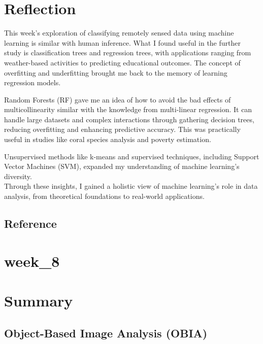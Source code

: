 \documentclass[
  letterpaper,
  DIV=11,
  numbers=noendperiod]{scrreprt}
\begin{document}

\chapter{Reflection}\label{reflection-3}

This week's exploration of classifying remotely sensed data using
machine learning is similar with human inference. What I found useful in
the further study is classification trees and regression trees, with
applications ranging from weather-based activities to predicting
educational outcomes. The concept of overfitting and underfitting
brought me back to the memory of learning regression models.

Random Forests (RF) gave me an idea of how to avoid the bad effects of
multicollinearity similar with the knowledge from multi-linear
regression. It can handle large datasets and complex interactions
through gathering decision trees, reducing overfitting and enhancing
predictive accuracy. This was practically useful in studies like coral
species analysis and poverty estimation.

Unsupervised methods like k-means and supervised techniques, including
Support Vector Machines (SVM), expanded my understanding of machine
learning's diversity.\\
Through these insights, I gained a holistic view of machine learning's
role in data analysis, from theoretical foundations to real-world
applications.

\section{\texorpdfstring{\textbf{Reference}}{Reference}}\label{reference}


\chapter{week\_8}\label{week_8}


\chapter{Summary}\label{summary-2}

\section{Object-Based Image Analysis
(OBIA)}\label{object-based-image-analysis-obia}
\end{document}
